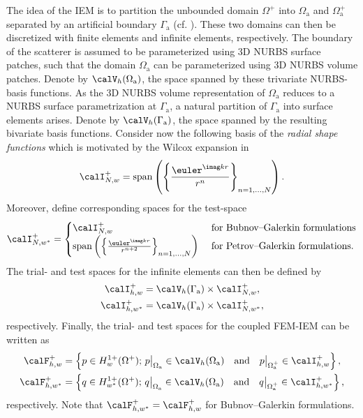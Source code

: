 The idea of the IEM is to partition the unbounded domain $\Omega^+$ into $\Omega_{\mathrm{a}}$ and $\Omega_{\mathrm{a}}^+$ separated by an artificial boundary $\Gamma_{\mathrm{a}}$ (cf. ). These two domains can then be discretized with finite elements and infinite elements, respectively. The boundary of the scatterer is assumed to be parameterized using 3D NURBS surface patches, such that the domain $\Omega_{\mathrm{a}}$ can be parameterized using 3D NURBS volume patches. Denote by $\calV_h(\Omega_{\mathrm{a}})$, the space spanned by these trivariate NURBS-basis functions. As the 3D NURBS volume representation of $\Omega_{\mathrm{a}}$ reduces to a NURBS surface parametrization at $\Gamma_{\mathrm{a}}$, a natural partition of $\Gamma_{\mathrm{a}}$ into surface elements arises. Denote by $\calV_h(\Gamma_{\mathrm{a}})$, the space spanned by the resulting bivariate basis functions. Consider now the following basis of the \textit{radial shape functions} which is motivated by the Wilcox expansion in 
\begin{equation}
	\calI_{N, w}^+ = \mathrm{span}\left(\left\{\frac{\euler^{\imag k r}}{r^n}\right\}_{n=1,\dots,N}\right).
\end{equation}
Moreover, define corresponding spaces for the test-space
\begin{equation}
\calI_{N, w^*}^+ = \begin{cases}
	\calI_{N, w}^+  & \text{ for Bubnov--Galerkin formulations}\\
	\mathrm{span}\left(\left\{\frac{\euler^{\imag k r}}{r^{n+2}}\right\}_{n=1,\dots,N}\right) & \text{ for Petrov--Galerkin formulations}.
	\end{cases}
\end{equation}
The trial- and test spaces for the infinite elements can then be defined by
\begin{align}
	\calI_{h, w}^+ &= \calV_h(\Gamma_{\mathrm{a}})\times \calI_{N, w}^+,\\
	\calI_{h, w^*}^+ &= \calV_h(\Gamma_{\mathrm{a}})\times \calI_{N, w^*}^+,
\end{align}
respectively. Finally, the trial- and test spaces for the coupled FEM-IEM can be written as
\begin{align}
	\calF^+_{h,w} &= \left\{p\in H_w^{1+}(\Omega^+);\, p\big|_{\Omega_{\mathrm{a}}}\in \calV_h(\Omega_{\mathrm{a}})\quad\text{and}\quad p\big|_{\Omega_{\mathrm{a}}^+}\in \calI_{h, w}^+\right\},\\
	\calF^+_{h,w^*} &= \left\{q\in H_{w^*}^{1+}(\Omega^+);\, q\big|_{\Omega_{\mathrm{a}}}\in \calV_h(\Omega_{\mathrm{a}})\quad\text{and}\quad q\big|_{\Omega_{\mathrm{a}}^+}\in \calI_{h, w^*}^+\right\},
\end{align}
respectively. Note that $\calF^+_{h,w^*}=\calF^+_{h,w}$ for Bubnov--Galerkin formulations.

